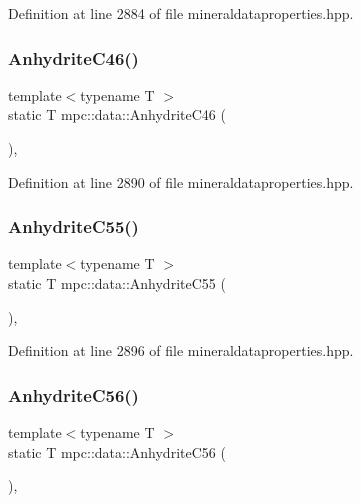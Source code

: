 Definition at line 2884 of file mineraldataproperties.\+hpp.

\mbox{\label{namespacempc_1_1data_af03a6421742d20f8b35688da2b7dcc30}} 
\subsubsection{\texorpdfstring{Anhydrite\+C46()}{AnhydriteC46()}}
{\footnotesize\ttfamily template$<$typename T $>$ \\
static T mpc\+::data\+::\+Anhydrite\+C46 (\begin{DoxyParamCaption}{ }\end{DoxyParamCaption})\hspace{0.3cm}{\ttfamily [inline]}, {\ttfamily [static]}}



Definition at line 2890 of file mineraldataproperties.\+hpp.

\mbox{\label{namespacempc_1_1data_a44d4f0fa5980f4ff77f3a405ec8b2c92}} 
\subsubsection{\texorpdfstring{Anhydrite\+C55()}{AnhydriteC55()}}
{\footnotesize\ttfamily template$<$typename T $>$ \\
static T mpc\+::data\+::\+Anhydrite\+C55 (\begin{DoxyParamCaption}{ }\end{DoxyParamCaption})\hspace{0.3cm}{\ttfamily [inline]}, {\ttfamily [static]}}



Definition at line 2896 of file mineraldataproperties.\+hpp.

\mbox{\label{namespacempc_1_1data_a7d6b77316e9c918bd1041517f00d753c}} 
\subsubsection{\texorpdfstring{Anhydrite\+C56()}{AnhydriteC56()}}
{\footnotesize\ttfamily template$<$typename T $>$ \\
static T mpc\+::data\+::\+Anhydrite\+C56 (\begin{DoxyParamCaption}{ }\end{DoxyParamCaption})\hspace{0.3cm}{\ttfamily [inline]}, {\ttfamily [static]}}




